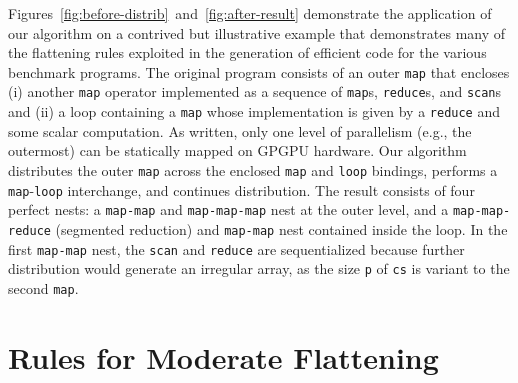 Figures~\ref{fig:before-distrib}~and~\ref{fig:after-result}
demonstrate the application of our algorithm on a contrived but
illustrative example that demonstrates many of the flattening rules
exploited in the generation of efficient code for the various
benchmark programs.  The original program consists of an outer
\lstinline{map} that encloses (i) another \lstinline{map} operator
implemented as a sequence of \lstinline{map}s, \lstinline{reduce}s,
and \lstinline{scan}s and (ii) a loop containing a \lstinline{map}
whose implementation is given by a \lstinline{reduce} and some scalar
computation.  As written, only one level of parallelism (e.g., the
outermost) can be statically mapped on GPGPU hardware. Our algorithm
distributes the outer \lstinline{map} across the enclosed
\lstinline{map} and \lstinline{loop} bindings, performs a
\lstinline{map}-\lstinline{loop} interchange, and continues
distribution.  The result consists of four perfect nests: a
\lstinline{map-map} and \lstinline{map-map-map} nest at the outer
level, and a \lstinline{map-map-reduce} (segmented reduction) and
\lstinline{map-map} nest contained inside the loop.  In the first
\lstinline{map-map} nest, the \lstinline{scan} and \lstinline{reduce}
are sequentialized because further distribution would generate an
irregular array, as the size \lstinline{p} of \lstinline{cs} is
variant to the second \lstinline{map}.

\section{Rules for Moderate Flattening}

